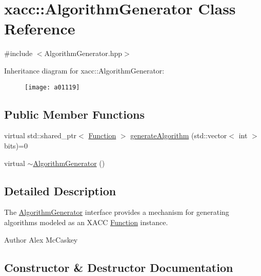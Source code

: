\hypertarget{a01119}{}\section{xacc\+:\+:Algorithm\+Generator Class Reference}
\label{a01119}


{\ttfamily \#include $<$Algorithm\+Generator.\+hpp$>$}

Inheritance diagram for xacc\+:\+:Algorithm\+Generator\+:\begin{figure}[H]
\begin{center}
\leavevmode
\texttt{[image: a01119]}
\end{center}
\end{figure}
\subsection*{Public Member Functions}
\begin{DoxyCompactItemize}
\item 
virtual std\+::shared\+\_\+ptr$<$ \hyperlink{a01127}{Function} $>$ \hyperlink{a01119_a73023c06f0f0c62ad56ab4187b18b096}{generate\+Algorithm} (std\+::vector$<$ int $>$ bits)=0
\item 
virtual \hyperlink{a01119_a096f66aa8d65f5aa3276915768159579}{$\sim$\+Algorithm\+Generator} ()
\end{DoxyCompactItemize}


\subsection{Detailed Description}
The \hyperlink{a01119}{Algorithm\+Generator} interface provides a mechanism for generating algorithms modeled as an X\+A\+CC \hyperlink{a01127}{Function} instance.

\begin{DoxyAuthor}{Author}
Alex Mc\+Caskey 
\end{DoxyAuthor}


\subsection{Constructor \& Destructor Documentation}
\mbox{\label{a01119_a096f66aa8d65f5aa3276915768159579}} 
